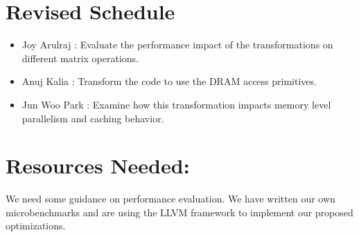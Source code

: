 \documentclass[letterpaper]{article}
\begin{document}
\section{Revised Schedule}

\begin{itemize}
\item Joy Arulraj : Evaluate the performance impact of the transformations on different matrix operations.
\item Anuj Kalia : Transform the code to use the DRAM access primitives.  
\item Jun Woo Park : Examine how this transformation impacts memory level parallelism and caching behavior.
\end{itemize}

\section{Resources Needed:} 

We need some guidance on performance evaluation. We have written our own microbenchmarks and
are using the LLVM framework to implement our proposed optimizations.

%
%
\end{document}
